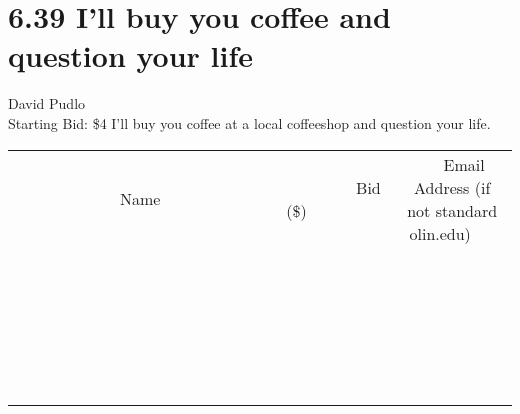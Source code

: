 \documentclass[11pt]{article}
\begin{document}
\section*{6.39 I'll buy you coffee and question your life}
David Pudlo
\\
Starting Bid: \$4
\newline
I'll buy you coffee at a local coffeeshop and question your life.
\\[6ex]
\begin{tabular}{c c c}
~~~~~~~~~~~~~Name~~~~~~~~~~~~~ & ~~~~~~~~~Bid (\$)~~~~~~~~~  & ~~~Email Address (if not standard olin.edu)~~~\\
 & & \\
\hline
 & & \\
\hline
 & & \\
\hline
 & & \\
\hline
 & & \\
\hline
 & & \\
\hline
 & & \\
\hline
 & & \\
\hline
 & & \\
\hline
 & & \\
\hline
 & & \\
\hline
 & & \\
\hline
 & & \\
\hline
 & & \\
\hline
 & & \\
\hline
 & & \\
\hline
 & & \\
\hline
 & & \\
\hline
 & & \\
\hline
 & & \\
\hline
 & & \\
\hline
 & & \\
\hline
 & & \\
\hline
 & & \\
\hline
 & & \\
\hline
 & & \\
\hline
\end{tabular}
\newpage
\end{document}
